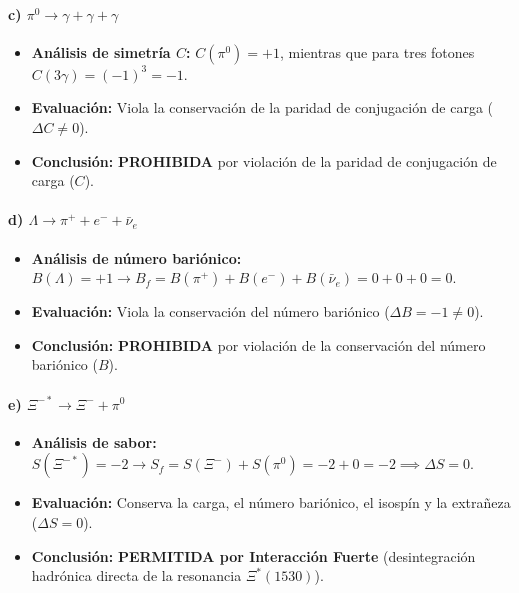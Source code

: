 \begin{problema}
\paragraph{c) $\pi^0 \longrightarrow \gamma + \gamma + \gamma$}
\begin{itemize}
    \item \textbf{Análisis de simetría $C$:} $C(\pi^0) = +1$, mientras que para tres fotones $C(3\gamma) = (-1)^3 = -1$.
    \item \textbf{Evaluación:} Viola la conservación de la paridad de conjugación de carga ($\Delta C \neq 0$).
    \item \textbf{Conclusión:} \textbf{PROHIBIDA} por violación de la paridad de conjugación de carga ($C$).
\end{itemize}

\paragraph{d) $\Lambda \longrightarrow \pi^+ + e^- + \bar{\nu}_e$}
\begin{itemize}
    \item \textbf{Análisis de número bariónico:} $B(\Lambda) = +1 \to B_f = B(\pi^+) + B(e^-) + B(\bar{\nu}_e) = 0 + 0 + 0 = 0$.
    \item \textbf{Evaluación:} Viola la conservación del número bariónico ($\Delta B = -1 \neq 0$).
    \item \textbf{Conclusión:} \textbf{PROHIBIDA} por violación de la conservación del número bariónico ($B$).
\end{itemize}

\paragraph{e) $\Xi^{-*} \longrightarrow \Xi^- + \pi^0$}
\begin{itemize}
    \item \textbf{Análisis de sabor:} $S(\Xi^{-*}) = -2 \to S_f = S(\Xi^-) + S(\pi^0) = -2 + 0 = -2 \implies \Delta S = 0$.
    \item \textbf{Evaluación:} Conserva la carga, el número bariónico, el isospín y la extrañeza ($\Delta S = 0$).
    \item \textbf{Conclusión:} \textbf{PERMITIDA por Interacción Fuerte} (desintegración hadrónica directa de la resonancia $\Xi^*(1530)$).
\end{itemize}
\end{problema}